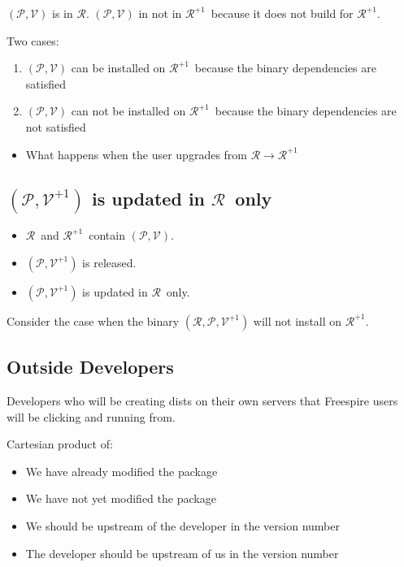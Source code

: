 \documentclass[11pt]{article}
\newcommand{\release}{\ensuremath{\mathcal{R}}}
\newcommand{\nextrelease}{\ensuremath{\mathcal{R}^{+1}}}
\newcommand{\version}{\ensuremath{\mathcal{V}}}
\newcommand{\nextversion}{\ensuremath{\mathcal{V}^{+1}}}
\newcommand{\package}{\ensuremath{\mathcal{P}}}
\begin{document}
$(\package,\version)$ is in \release.
$(\package,\version)$ in not in \nextrelease\ because it does not build for \nextrelease.

Two cases:
\begin{enumerate}
\item $(\package, \version)$ can be installed on \nextrelease\ because the binary dependencies are satisfied
\item $(\package, \version)$ can not be installed on \nextrelease\ because the binary dependencies are not satisfied
\end{enumerate}

\begin{itemize}
\item What happens when the user upgrades from $\release \rightarrow \nextrelease$
\end{itemize}

\subsection{$(\package, \nextversion)$ is updated in \release\ only}

\begin{itemize}
\item \release\ and \nextrelease\ contain $(\package, \version)$.
\item $(\package, \nextversion)$ is released.
\item $(\package, \nextversion)$ is updated in \release\ only.
\end{itemize}

Consider the case when the binary $(\release, \package, \nextversion)$ will not install on \nextrelease.

\subsection{Outside Developers}

Developers who will be creating dists on their own servers that
Freespire users will be clicking and running from.

Cartesian product of:

\begin{itemize}
\item We have already modified the package 
\item We have not yet modified the package
\end{itemize}

\begin{itemize}
\item We should be upstream of the developer in the version number
\item The developer should be upstream of us in the version number
\end{itemize}
\end{document}
